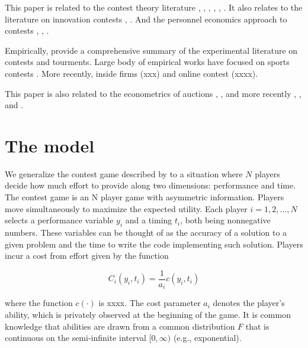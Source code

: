 \documentclass[12pt,]{article}
\begin{document}
This paper is related to the contest theory literature
\citet{dixit1987strategic} \citet{baye2003strategic},
\citet{parreiras2010contests}, \citet{moldovanu2001optimal},
\citet{moldovanu2006contest}, \citet{siegel2009all},
\citet{siegel2014contests}. It also relates to the literature on
innovation contests \citet{taylor1995digging}, \citet{che2003optimal}.
And the personnel economics approach to contests \citet{lazear1981rank},
\citet{green1983comparison}, \citet{mary1984economic}.

Empirically, \citet{dechenaux2014survey} provide a comprehensive summary
of the experimental literature on contests and tourments. Large body of
empirical works have focused on sports contests
\citet{szymanski2003economic}. More recently, inside firms (xxx) and
online contest (xxxx).

This paper is also related to the econometrics of auctions
\citet{paarsch1992deciding}, \citet{laffont1995econometrics},
\citet{donald1996identification} and more recently
\citet{athey2011comparing}, \citet{athey2002identification}, and
\citet{athey2007nonparametric}.

\section{The model}\label{the-model}

We generalize the contest game described by \citet{moldovanu2001optimal}
to a situation where \(N\) players decide how much effort to provide
along two dimensions: performance and time. The contest game is an N
player game with asymmetric information. Players move simultaneously to
maximize the expected utility. Each player \(i=1, 2, ..., N\) selects a
performance variable \(y_i\) and a timing \(t_i\), both being
nonnegative numbers. These variables can be thought of as the accuracy
of a solution to a given problem and the time to write the code
implementing such solution. Players incur a cost from effort given by
the function

\begin{equation}
  C_i(y_i, t_i) = \frac{1}{a_i} c(y_i, t_i)
\end{equation}

where the function \(c(\cdot)\) is xxxx. The cost parameter \(a_i\)
denotes the player's ability, which is privately observed at the
beginning of the game. It is common knowledge that abilities are drawn
from a common distribution \(F\) that is continuous on the semi-infinite
interval \([0,\infty)\) (e.g., exponential).
\end{document}

